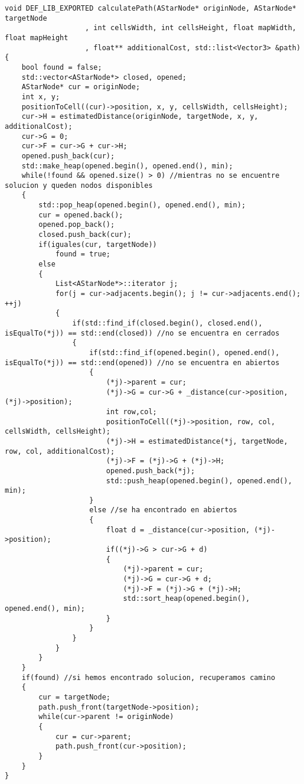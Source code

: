 \begin{lstlisting}
void DEF_LIB_EXPORTED calculatePath(AStarNode* originNode, AStarNode* targetNode
                   , int cellsWidth, int cellsHeight, float mapWidth, float mapHeight
                   , float** additionalCost, std::list<Vector3> &path) 
{
    bool found = false;
    std::vector<AStarNode*> closed, opened;
    AStarNode* cur = originNode;
    int x, y;
    positionToCell((cur)->position, x, y, cellsWidth, cellsHeight);
    cur->H = estimatedDistance(originNode, targetNode, x, y, additionalCost);
    cur->G = 0; 
    cur->F = cur->G + cur->H;
    opened.push_back(cur);
    std::make_heap(opened.begin(), opened.end(), min);
    while(!found && opened.size() > 0) //mientras no se encuentre solucion y queden nodos disponibles
    {
        std::pop_heap(opened.begin(), opened.end(), min);
        cur = opened.back();
        opened.pop_back(); 
        closed.push_back(cur);
        if(iguales(cur, targetNode))
            found = true;
        else
        {
            List<AStarNode*>::iterator j; 
            for(j = cur->adjacents.begin(); j != cur->adjacents.end(); ++j) 
            {
                if(std::find_if(closed.begin(), closed.end(), isEqualTo(*j)) == std::end(closed)) //no se encuentra en cerrados
                {
                    if(std::find_if(opened.begin(), opened.end(), isEqualTo(*j)) == std::end(opened)) //no se encuentra en abiertos
                    {
                        (*j)->parent = cur;
                        (*j)->G = cur->G + _distance(cur->position, (*j)->position);
                        int row,col;
                        positionToCell((*j)->position, row, col, cellsWidth, cellsHeight);
                        (*j)->H = estimatedDistance(*j, targetNode, row, col, additionalCost);
                        (*j)->F = (*j)->G + (*j)->H;
                        opened.push_back(*j);
                        std::push_heap(opened.begin(), opened.end(), min);
                    }
                    else //se ha encontrado en abiertos
                    {
                        float d = _distance(cur->position, (*j)->position);
                        if((*j)->G > cur->G + d)
                        {
                            (*j)->parent = cur;
                            (*j)->G = cur->G + d;
                            (*j)->F = (*j)->G + (*j)->H;
                            std::sort_heap(opened.begin(), opened.end(), min);
                        }
                    }
                }
            }
        }
    }
    if(found) //si hemos encontrado solucion, recuperamos camino
    {
        cur = targetNode;
        path.push_front(targetNode->position);
		while(cur->parent != originNode)
		{
			cur = cur->parent;
			path.push_front(cur->position);
		}
    }
}
\end{lstlisting}